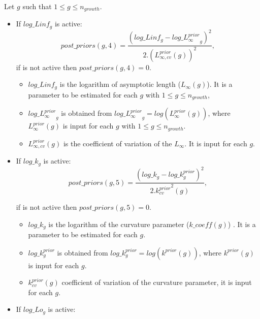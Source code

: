 \documentclass{article}
\begin{document}
Let $g$ such that $1\leq g \leq n_{growth}$.
    \begin{itemize}
        \item If $log\_Linf_g$ is active:
        \begin{equation}
            post\_priors(g,4) = \dfrac{(log\_Linf_g-log\_{L_{\infty}^{prior}}_g)^2}{2.(L_{\infty,cv}^{prior}(g))^2},
        \end{equation}
        if is not active then $post\_priors(g,4)=0.$
        \begin{itemize}
            \item $log\_Linf_g$ is the logarithm of asymptotic length ($L_{\infty}(g)$). It is a parameter to be estimated for each $g$ with $1\leq g \leq n_{growth}$,
            \item $log\_{L_{\infty}^{prior}}_g$ is obtained from $log\_{L_{\infty}^{prior}}_g=log(L_{\infty}^{prior}(g))$, where $L_{\infty}^{prior}(g)$ is input for each $g$ with $1\leq g\leq n_{growth}$.
            \item $L_{\infty,cv}^{prior}(g)$ is the coefficient of variation of the $L_{\infty}$. It is input for each $g$.
        \end{itemize}
        
        \item If $log\_k_g$ is active:
        \begin{equation}
            post\_priors(g,5) = \dfrac{(log\_k_g-log\_k^{prior}_g)^2}{2.{k^{prior}_{cv}}^2(g)},
        \end{equation}
        
        if is not active then $post\_priors(g,5)=0$.
        
        \begin{itemize}
            \item $log\_k_g$ is the logarithm of the curvature parameter ($k\_coeff(g)$) . It is a parameter to be estimated for each $g$.
            
            \item $log\_k^{prior}_g$ is obtained from $log\_k^{prior}_g=log(k^{prior}(g))$, where $k^{prior}(g)$ is input for each $g$.
            
            \item $k^{prior}_{cv}(g)$ coefficient of variation of the curvature parameter, it is input for each $g$.
        \end{itemize}
        
        \item If $log\_Lo_g$ is active:
        

\end{itemize}
\end{document}
